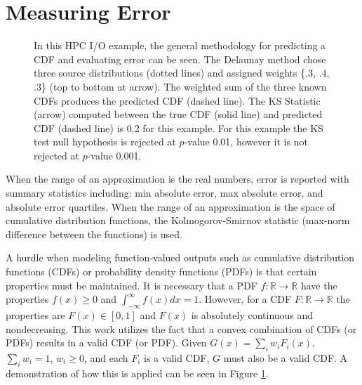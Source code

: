 \documentclass[smallextended,final]{svjour3}  %
\begin{document}
\section{Measuring Error}
\label{sec:error}

\begin{figure}[htb]
  \centering
  \vspace{-0.3cm}
  \caption{In this HPC I/O example, the general methodology for
    predicting a CDF and evaluating error can be seen. The Delaunay
    method chose three source distributions (dotted lines) and
    assigned weights \{.3, .4, .3\} (top to bottom at arrow). The
    weighted sum of the three known CDFs produces the predicted CDF
    (dashed line). The KS Statistic (arrow) computed between the true
    CDF (solid line) and predicted CDF (dashed line) is 0.2 for this
    example. For this example the KS test null hypothesis is rejected
    at $p$-value 0.01, however it is not rejected at $p$-value 0.001.
  \vspace{-.1cm}}
  \label{fig:prediction-example}
\end{figure}

When the range of an approximation is the real numbers, error is
reported with summary statistics including: min absolute error, max
absolute error, and absolute error quartiles. When the range of an
approximation is the space of cumulative distribution functions, the
Kolmogorov-Smirnov statistic (max-norm difference between the
functions) is used.

A hurdle when modeling function-valued outputs such as cumulative
distribution functions (CDFs) or probability density functions (PDFs)
is that certain properties must be maintained. It is necessary that a
PDF $f: \mathbb{R} \rightarrow \mathbb{R}$ have the properties $f(x)
\geq 0$ and $\int_{-\infty}^{\infty}f(x)dx = 1$. However, for a CDF
$F: \mathbb{R} \rightarrow \mathbb{R}$ the properties are
$F(x) \in [0,1]$ and $F(x)$ is absolutely continuous and
nondecreasing. This work utilizes the fact that a convex combination
of CDFs (or PDFs) results in a valid CDF (or PDF). Given $G(x) =
\sum_{i}w_i F_i(x)$, $\sum_{i} w_i = 1$, $w_i \geq 0$, and each $F_i$
is a valid CDF, $G$ must also be a valid CDF. A demonstration of how
this is applied can be seen in Figure \ref{fig:prediction-example}.
\end{document}
